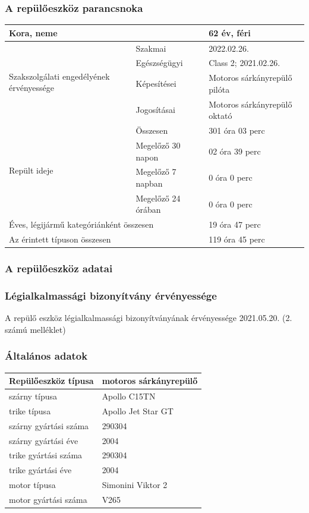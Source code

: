 \documentclass[a4paper,10pt]{article}
\begin{document}
\subsubsection{A repülőeszköz parancsnoka}
\begin{tabular}{|l|l|l|}
\hline
 \multicolumn{2}{|l|}{Kora, neme} & 62 év, féri\\ \hline
 \multirow{4}{3cm}{Szakszolgálati engedélyének érvényessége}
    & Szakmai & 2022.02.26.\\ \cline{2-3}
    & Egészségügyi & Class 2; 2021.02.26.\\ \cline{2-3}
    & Képesítései & Motoros sárkányrepülő pilóta\\ \cline{2-3}
    & Jogosításai & Motoros sárkányrepülő oktató\\ \cline{2-3}
 \hline 
 \multirow{4}{3cm}{Repült ideje}
    & Összesen & 301 óra 03 perc\\ \cline{2-3}
    & Megelőző 30 napon & 02 óra 39 perc\\ \cline{2-3}
    & Megelőző 7 napban & 0 óra 0 perc\\ \cline{2-3}
    & Megelőző 24 órában & 0 óra 0 perc\\ \cline{2-3}
 \hline
 \multicolumn{2}{|l|}{Éves, légijármű kategóriánként összesen} & 19 óra 47 
perc\\ \hline
 \multicolumn{2}{|l|}{Az érintett típuson összesen} & 119 óra 45 perc\\ \hline
\end{tabular}

\subsubsection{A repülőeszköz adatai}
\subsubsection{Légialkalmassági bizonyítvány érvényessége}
A repülő eszköz légialkalmassági bizonyítványának érvényessége 2021.05.20.
(2. számú melléklet)

\subsubsection{Általános adatok}
\begin{tabular}{|l|l|}
 \hline
 Repülőeszköz típusa & motoros sárkányrepülő\\ \hline
 szárny típusa & Apollo C15TN\\ \hline
 trike típusa & Apollo Jet Star GT\\ \hline
 szárny gyártási száma & 290304\\ \hline
 szárny gyártási éve & 2004\\ \hline
 trike gyártási száma & 290304\\ \hline
 trike gyártási éve & 2004\\ \hline
 motor típusa & Simonini Viktor 2\\ \hline
 motor gyártási száma & V265\\ \hline
\end{tabular}
\end{document}

